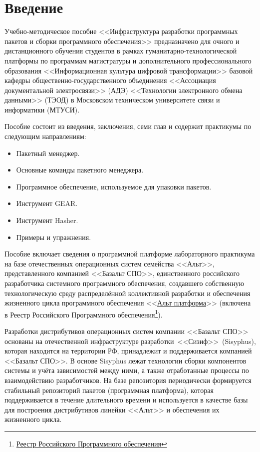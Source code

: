 \chapter*{Введение}

Учебно-методическое пособие <<Инфраструктура разработки программных пакетов и сборки 
программного обеспечения>> предназначено для очного и дистанционного обучения студентов 
в рамках гуманитарно-технологической платформы по программам магистратуры и 
дополнительного профессионального образования <<Информационная культура цифровой 
трансформации>> базовой кафедры общественно-государственного объединения <<Ассоциация 
документальной электросвязи>> (АДЭ) <<Технологии электронного обмена данными>> (ТЭОД) 
в Московском техническом университете связи и информатики (МТУСИ). 

Пособие состоит из введения, заключения, семи глав и содержит практикумы по следующим направлениям:
\begin{itemize}
	\item Пакетный менеджер.
	\item Основные команды пакетного менеджера.
	\item Программное обеспечение, используемое для упаковки пакетов.
	\item Инструмент GEAR.
	\item Инструмент Hasher.
	\item Примеры и упражнения.
\end{itemize}

Пособие включает сведения о программной платформе лабораторного практикума на базе 
отечественных операционных систем семейства <<Альт>>, представленного компанией <<Базальт СПО>>, 
единственного российского разработчика системного программного обеспечения, создавшего 
собственную технологическую среду распределённой коллективной разработки и обеспечения 
жизненного цикла программного обеспечения <<\href{https://www.basealt.ru/alt-platform}{Альт платформа}>> 
(включена в Реестр Российского Программного обеспечения\footnote{\href{https://reestr.digital.gov.ru}{Реестр Российского Программного обеспечения}}).

Разработки дистрибутивов операционных систем компании <<Базальт СПО>> основаны на 
отечественной инфраструктуре разработки <<Сизиф>> (Sisyphus), которая находится на 
территории РФ, принадлежит и поддерживается компанией <<Базальт СПО>>. В основе 
Sisyphus лежат технологии сборки компонентов системы и учёта зависимостей между ними, а
также отработанные процессы по взаимодействию разработчиков. На базе репозитория
периодически формируется стабильный репозиторий пакетов (программная платформа), которая поддерживается
в течение длительного времени и используется в качестве базы для построения дистрибутивов 
линейки <<Альт>> и обеспечения их жизненного цикла.

